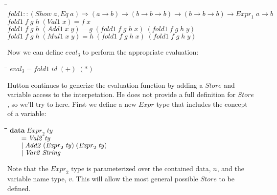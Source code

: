 \documentclass[10pt]{article}
\newlength{\lwidth}\setlength{\lwidth}{4.5cm}
\newlength{\cwidth}\setlength{\cwidth}{8mm} %
\newcommand{\Conid}[1]{\mathit{#1}}
\newcommand{\Varid}[1]{\mathit{#1}}
\begin{document}
\begin{tabbing}
\qquad\=\hspace{\lwidth}\=\hspace{\cwidth}\=\+\kill
${\Varid{fold1}\mathbin{::}(\Conid{Show}\;\Varid{a},\Conid{Eq}\;\Varid{a})\Rightarrow (\Varid{a}\to \Varid{b})\to (\Varid{b}\to \Varid{b}\to \Varid{b})\to (\Varid{b}\to \Varid{b}\to \Varid{b})\to \Varid{Expr}_1\;\Varid{a}\to \Varid{b}}$\\
${\Varid{fold1}\;\Varid{f}\;\Varid{g}\;\Varid{h}\;(\Conid{Val1}\;\Varid{x})\mathrel{=}\Varid{f}\;\Varid{x}}$\\
${\Varid{fold1}\;\Varid{f}\;\Varid{g}\;\Varid{h}\;(\Conid{Add1}\;\Varid{x}\;\Varid{y})\mathrel{=}\Varid{g}\;(\Varid{fold1}\;\Varid{f}\;\Varid{g}\;\Varid{h}\;\Varid{x})\;(\Varid{fold1}\;\Varid{f}\;\Varid{g}\;\Varid{h}\;\Varid{y})}$\\
${\Varid{fold1}\;\Varid{f}\;\Varid{g}\;\Varid{h}\;(\Conid{Mul1}\;\Varid{x}\;\Varid{y})\mathrel{=}\Varid{h}\;(\Varid{fold1}\;\Varid{f}\;\Varid{g}\;\Varid{h}\;\Varid{x})\;(\Varid{fold1}\;\Varid{f}\;\Varid{g}\;\Varid{h}\;\Varid{y})}$
\end{tabbing}
Now we can define \ensuremath{\Varid{eval}_3} to perform the appropriate evaluation:

\begin{tabbing}
\qquad\=\hspace{\lwidth}\=\hspace{\cwidth}\=\+\kill
${\Varid{eval}_3\mathrel{=}\Varid{fold1}\;\Varid{id}\;(\mathbin{+})\;(\mathbin{*})}$
\end{tabbing}
Hutton continues to generize the evaluation function by adding a
\ensuremath{\Conid{Store}} and variable access to the interpetation.  He does not provide
a full definition for \ensuremath{\Conid{Store}}, so we'll try to here.  First we define
a new \ensuremath{\Conid{Expr}} type that includes the concept of a variable:

\begin{tabbing}
\qquad\=\hspace{\lwidth}\=\hspace{\cwidth}\=\+\kill
${\mathbf{data}\;\Varid{Expr}_2\;\Varid{ty}}$\\
${\hskip2.00em\relax\mathrel{=}\Conid{Val2}\;\Varid{ty}}$\\
${\hskip2.00em\relax\mid \Conid{Add2}\;(\Varid{Expr}_2\;\Varid{ty})\;(\Varid{Expr}_2\;\Varid{ty})}$\\
${\hskip2.00em\relax\mid \Conid{Var2}\;\Conid{String}}$
\end{tabbing}
Note that the \ensuremath{\Varid{Expr}_2} type is parameterized over the contained data,
\ensuremath{\Varid{n}}, and the variable name type, \ensuremath{\Varid{v}}.  This will allow the most
general possible \ensuremath{\Conid{Store}} to be defined.
\end{document}
